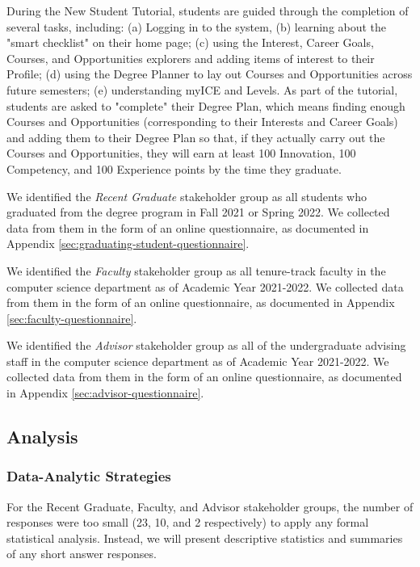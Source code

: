 \documentclass[acmsmall,nonacm]{acmart}
\begin{document}
During the New Student Tutorial, students are guided through the completion of several tasks, including: (a) Logging in to the system, (b) learning about the "smart checklist" on their home page; (c) using the Interest, Career Goals, Courses, and Opportunities explorers and adding items of interest to their Profile; (d) using the Degree Planner to lay out Courses and Opportunities across future semesters; (e) understanding myICE and Levels. As part of the tutorial, students are asked to "complete" their Degree Plan, which means finding enough Courses and Opportunities (corresponding to their Interests and Career Goals) and adding them to their Degree Plan so that, if they actually carry out the Courses and Opportunities, they will earn at least 100 Innovation, 100 Competency, and 100 Experience points by the time they graduate.

We identified the {\em Recent Graduate} stakeholder group as all students who graduated from the degree program in Fall 2021 or Spring 2022.  We collected data from them in the form of an online questionnaire, as documented in Appendix \ref{sec:graduating-student-questionnaire}.

We identified the {\em Faculty} stakeholder group as all tenure-track faculty in the computer science department as of Academic Year 2021-2022. We collected data from them in the form of an online questionnaire, as documented in Appendix \ref{sec:faculty-questionnaire}.

We identified the {\em Advisor} stakeholder group as all of the undergraduate advising staff in the computer science department as of Academic Year 2021-2022. We collected data from them in the form of an online questionnaire, as documented in Appendix \ref{sec:advisor-questionnaire}.

\subsection{Analysis}

\subsubsection{Data-Analytic Strategies}

For the Recent Graduate, Faculty, and Advisor stakeholder groups, the number of responses were too small (23, 10, and 2 respectively) to apply any formal statistical analysis.  Instead, we will present descriptive statistics and summaries of any short answer responses.
\end{document}
